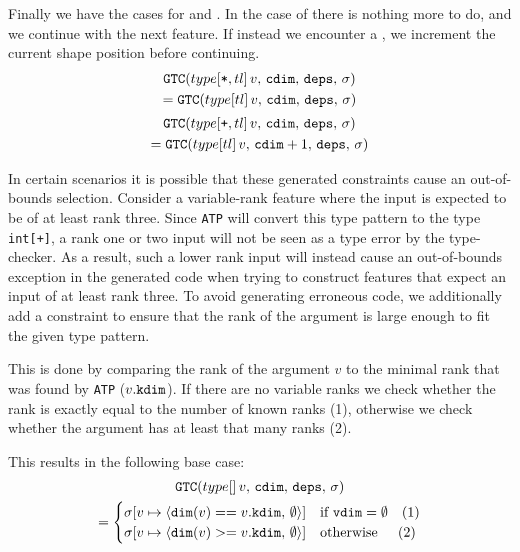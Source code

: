 \noindent
Finally we have the cases for \tpstar{} and \tpplus{}.
In the case of \tpstar{} there is nothing more to do, and we continue with the next feature.
If instead we encounter a \tpplus{}, we increment the current shape position before continuing.
\begin{gather*}
    \texttt{GTC}(type[\texttt{*},tl]\,v,\,\texttt{cdim},\,\texttt{deps},\,\sigma{}) \\
        = \texttt{GTC}(type[tl]\,v,\,\texttt{cdim},\,\texttt{deps},\,\sigma{})
    \\[2pt]
    \texttt{GTC}(type[\texttt{+},tl]\,v,\,\texttt{cdim},\,\texttt{deps},\,\sigma{}) \\
        = \texttt{GTC}(type[tl]\,v,\,\texttt{cdim}+1,\,\texttt{deps},\,\sigma{})
\end{gather*}

\noindent
In certain scenarios it is possible that these generated constraints cause an out-of-bounds selection.
Consider a variable-rank feature where the input is expected to be of at least rank three.
Since \texttt{ATP} will convert this type pattern to the type \texttt{int[+]}, a rank one or two input will not be seen as a type error by the type-checker.
As a result, such a lower rank input will instead cause an out-of-bounds exception in the generated code when trying to construct features that expect an input of at least rank three.
To avoid generating erroneous code, we additionally add a constraint to ensure that the rank of the argument is large enough to fit the given type pattern.

\noindent
This is done by comparing the rank of the argument $v$ to the minimal rank that was found by \texttt{ATP} ($v.\texttt{kdim}$).
If there are no variable ranks we check whether the rank is exactly equal to the number of known ranks (1), otherwise we check whether the argument has at least that many ranks (2).

This results in the following base case:
\begin{gather*}
    \texttt{GTC}(type[]\,v,\,\texttt{cdim},\,\texttt{deps},\,\sigma{}) \\
        = \begin{cases}
            \sigma{}[v\mapsto\langle{}\texttt{dim}(v) == v.\texttt{kdim},\,\emptyset\rangle{}]
                &\text{if } \texttt{vdim} = \emptyset
                \hspace{10pt}(1) \\
            \sigma{}[v\mapsto\langle{}\texttt{dim}(v) >= v.\texttt{kdim},\,\emptyset\rangle{}]
                &\text{otherwise}
                \hspace{14.5pt}(2)
        \end{cases}
\end{gather*}

